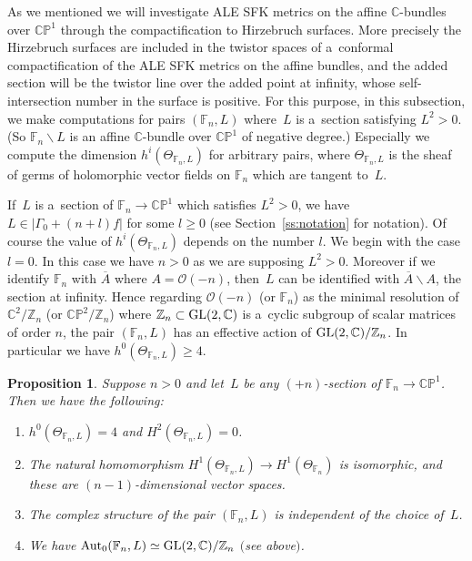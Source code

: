 \documentclass[11pt]{article}
\numberwithin{equation}{section}
\newtheorem{Proposition}[Theorem]{Proposition}
{\theoremstyle{definition}
\newtheorem{Definition}[Theorem]{Definition}
\newtheorem{Remark}[Theorem]{Remark}
}
\begin{document}
As we mentioned we will investigate ALE SFK metrics on the af\/f\/ine $\mathbb{C}$-bundles over $\mathbb{CP}^1$ through
the compactif\/ication to Hirzebruch surfaces.
More precisely the Hirzebruch surfaces are included in the twistor spaces of a~conformal compactif\/ication of the ALE
SFK metrics on the af\/f\/ine bundles, and the added section will be the twistor line over the added point at
inf\/inity, whose self-intersection number in the surface is positive.
For this purpose, in this subsection, we make computations for pairs $(\mathbb{F}_n,L)$ where~$L$ is a~section
satisfying $L^2>0$.
(So $\mathbb{F}_n\backslash L$ is an af\/f\/ine $\mathbb{C}$-bundle over $\mathbb{CP}^1$ of negative degree.) Especially
we compute the dimension $h^i(\Theta_{\mathbb{F}_n,L})$ for arbitrary pairs, where $\Theta_{\mathbb{F}_n,L}$ is the
sheaf of germs of holomorphic vector f\/ields on $\mathbb{F}_n$ which are tangent to~$L$.

If~$L$ is a~section of $\mathbb{F}_n\to\mathbb{CP}^1$ which satisf\/ies $L^2>0$, we have $L\in |\Gamma_0 + (n+l)f|$ for
some $l\ge 0$ (see Section~\ref{ss:notation} for notation). Of course the value of $h^i(\Theta_{\mathbb{F}_n,L})$
depends on the number $l$.
We begin with the case $l=0$.
In this case we have $n>0$ as we are supposing $L^2>0$.
Moreover if we identify $\mathbb{F}_n$ with $\overline A$ where $A=\mathscr O(-n)$, then~$L$ can be identif\/ied with
$\overline A\backslash A$, the section at inf\/inity.
Hence regarding $\mathscr O(-n)$ (or $\mathbb{F}_n$) as the minimal resolution of $\mathbb{C}^2/\mathbb{Z}_n$ (or
$\mathbb{CP}^2/\mathbb{Z}_n$) where $\mathbb{Z}_n\subset{\rm{GL}}(2,\mathbb{C})$ is a~cyclic subgroup of scalar matrices
of order $n$, the pair $(\mathbb{F}_n,L)$ has an ef\/fective action of ${\rm{GL}}(2,\mathbb{C})/\mathbb{Z}_n$.
In particular we have $h^0(\Theta_{\mathbb{F}_n,L}) \ge 4$.
\begin{Proposition}
\label{prop:l0}
Suppose $n>0$ and let~$L$ be any $(+n)$-section of $\mathbb{F}_n\to\mathbb{CP}^1$.
Then we have the following:
\begin{enumerate}\itemsep=0pt
\item[$(i)$] $h^0(\Theta_{\mathbb{F}_n, L})=4$ and $H^2(\Theta_{\mathbb{F}_n, L})=0$.
\item[$(ii)$] The natural homomorphism $H^1(\Theta_{\mathbb{F}_n, L}) \to H^1(\Theta_{\mathbb{F}_n})$ is isomorphic,
and these are $(n-1)$-dimensional vector spaces.
\item[$(iii)$] The complex structure of the pair $(\mathbb{F}_n,L)$ is independent of the choice of~$L$.
\item[$(iv)$] We have ${\rm{Aut}}_0(\mathbb{F}_n,L)\simeq {\rm{GL}}(2,\mathbb{C})/\mathbb{Z}_n$ $($see above$)$.
\end{enumerate}
\end{Proposition}
\end{document}
